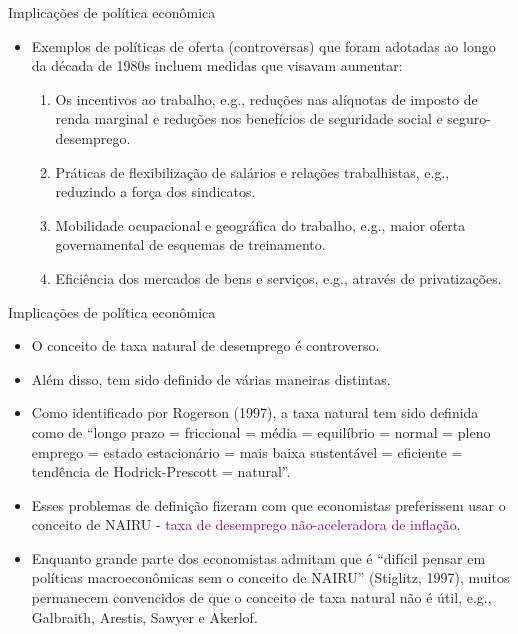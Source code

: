 \documentclass[10pt]{beamer}
\begin{document}
\begin{frame}{Implicações de política econômica}
    \begin{itemize}
        \item Exemplos de políticas de oferta (controversas) que foram adotadas ao longo da década de 1980s incluem medidas que visavam aumentar:
        \bigskip
        \begin{enumerate}
            \item Os incentivos ao trabalho, e.g., reduções nas alíquotas de imposto de renda marginal e reduções nos benefícios de seguridade social e seguro-desemprego.
            \bigskip
            \item Práticas de flexibilização de salários e relações trabalhistas, e.g., reduzindo a força dos sindicatos.
            \bigskip
            \item Mobilidade ocupacional e geográfica do trabalho, e.g., maior oferta governamental de esquemas de treinamento.
            \bigskip
            \item Eficiência dos mercados de bens e serviços, e.g., através de privatizações.
        \end{enumerate}
    \end{itemize}    
\end{frame}

\begin{frame}{Implicações de política econômica}
    \begin{itemize}
        \item O conceito de taxa natural de desemprego é controverso.
        \bigskip
        \item Além disso, tem sido definido de várias maneiras distintas.
        \bigskip
        \item Como identificado por Rogerson (1997), a taxa natural tem sido definida como de ``longo prazo = friccional = média = equilíbrio = normal = pleno emprego = estado estacionário = mais baixa sustentável = eficiente = tendência de Hodrick-Prescott = natural''.
        \bigskip
        \item Esses problemas de definição fizeram com que economistas preferissem usar o conceito de NAIRU - \textcolor{purple}{taxa de desemprego não-aceleradora de inflação}.
        \bigskip
        \item Enquanto grande parte dos economistas admitam que é ``difícil pensar em políticas macroeconômicas sem o conceito de NAIRU'' (Stiglitz, 1997), muitos permanecem convencidos de que o conceito de taxa natural não é útil, e.g., Galbraith, Arestis, Sawyer e Akerlof.
    \end{itemize}    
\end{frame}
\end{document}
